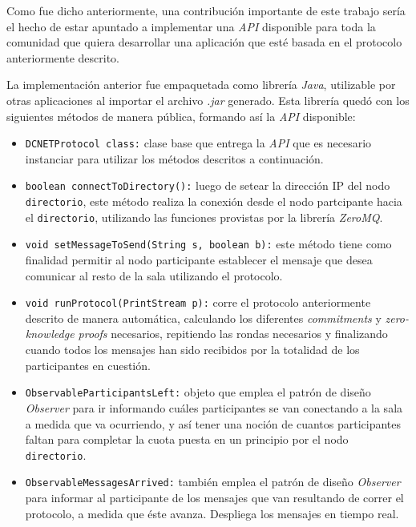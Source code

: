 {Como fue dicho anteriormente, una contribución importante de este trabajo 
sería el hecho de estar apuntado a implementar una \emph{API} disponible para 
toda la comunidad que quiera desarrollar una aplicación que esté basada en el 
protocolo anteriormente descrito. 

La implementación anterior fue empaquetada como librería \emph{Java}, 
utilizable por otras aplicaciones al importar el archivo \emph{.jar} generado. 
Esta librería quedó con los siguientes métodos de manera pública, formando así 
la \emph{API} disponible:

\begin{itemize}
    \item \texttt{DCNETProtocol class:} clase base que entrega la \emph{API} 
    que es necesario instanciar para utilizar los métodos descritos a 
    continuación. 
    \item \texttt{boolean connectToDirectory():} luego de setear la dirección 
    IP del nodo \texttt{directorio}, este método realiza la conexión desde el nodo partcipante
    hacia el \texttt{directorio}, utilizando las funciones provistas por la librería 
    \emph{ZeroMQ}.
    \item \texttt{void setMessageToSend(String s, boolean b):} este método tiene 
    como finalidad permitir al nodo participante establecer el mensaje que desea 
    comunicar al resto de la sala utilizando el protocolo. 
    \item \texttt{void runProtocol(PrintStream p):} corre el protocolo anteriormente 
    descrito de manera automática, calculando los diferentes \emph{commitments} y 
    \emph{zero-knowledge proofs} necesarios, repitiendo las rondas necesarios 
    y finalizando cuando todos los mensajes han sido recibidos por la totalidad 
    de los participantes en cuestión.
    \item \texttt{ObservableParticipantsLeft:} objeto que emplea el patrón de diseño 
    \emph{Observer} para ir informando cuáles participantes se van conectando a la sala 
    a medida que va ocurriendo, y así tener una noción de cuantos participantes faltan 
    para completar la cuota puesta en un principio por el nodo \texttt{directorio}.
    \item \texttt{ObservableMessagesArrived:} también emplea el patrón de diseño 
    \emph{Observer} para informar al participante de los mensajes que van resultando 
    de correr el protocolo, a medida que éste avanza. Despliega los mensajes en tiempo 
    real.
\end{itemize}

}
